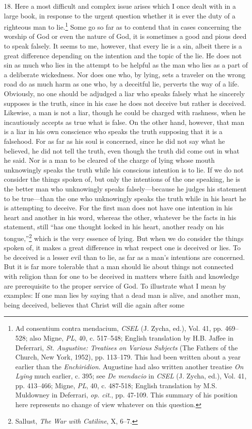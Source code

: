 18. Here a most difficult and complex issue arises which I once dealt with in a large book, in response to the urgent question whether it is ever the duty of a righteous man to lie.\footnote{Ad consentium contra mendacium, \emph{CSEL} (J. Zycha, ed.), Vol. 41, pp. 469–528; also Migne, \emph{PL}, 40, c. 517–548; English translation by H.B. Jaffee in Deferrari, \emph{St. Augustine: Treatises on Various Subjects} (The Fathers of the Church, New York, 1952), pp. 113–179. This had been written about a year earlier than the \emph{Enchiridion}. Augustine had also written another treatise \emph{On Lying} much earlier, c. 395; see \emph{De mendacio} in \emph{CSEL} (J. Zycha, ed.), Vol. 41, pp. 413–466; Migne, \emph{PL}, 40, c. 487-518; English translation by M.S. Muldowney in Deferrari, \emph{op. cit}., pp. 47-109. This summary of his position here represents no change of view whatever on this question.} Some go so far as to contend that in cases concerning the worship of God or even the nature of God, it is sometimes a good and pious deed to speak falsely. It seems to me, however, that every lie is a sin, albeit there is a great difference depending on the intention and the topic of the lie. He does not sin as much who lies in the attempt to be helpful as the man who lies as a part of a deliberate wickedness. Nor does one who, by lying, sets a traveler on the wrong road do as much harm as one who, by a deceitful lie, perverts the way of a life. Obviously, no one should be adjudged a liar who speaks falsely what he sincerely supposes is the truth, since in his case he does not deceive but rather is deceived. Likewise, a man is not a liar, though he could be charged with rashness, when he incautiously accepts as true what is false. On the other hand, however, that man is a liar in his own conscience who speaks the truth supposing that it is a falsehood. For as far as his soul is concerned, since he did not say what he believed, he did not tell the truth, even though the truth did come out in what he said. Nor is a man to be cleared of the charge of lying whose mouth unknowingly speaks the truth while his conscious intention is to lie. If we do not consider the things spoken of, but only the intentions of the one speaking, he is the better man who unknowingly speaks falsely—because he judges his statement to be true—than the one who unknowingly speaks the truth while in his heart he is attempting to deceive. For the first man does not have one intention in his heart and another in his word, whereas the other, whatever be the facts in his statement, still ``has one thought locked in his heart, another ready on his tongue,''\footnote{Sallust, \emph{The War with Catiline}, X, 6–7.} which is the very essence of lying. But when we do consider the things spoken of, it makes a great difference in what respect one is deceived or lies. To be deceived is a lesser evil than to lie, as far as a man's intentions are concerned. But it is far more tolerable that a man should lie about things not connected with religion than for one to be deceived in matters where faith and knowledge are prerequisite to the proper service of God. To illustrate what I mean by examples: If one man lies by saying that a dead man is alive, and another man, being deceived, believes that Christ will die again after some 